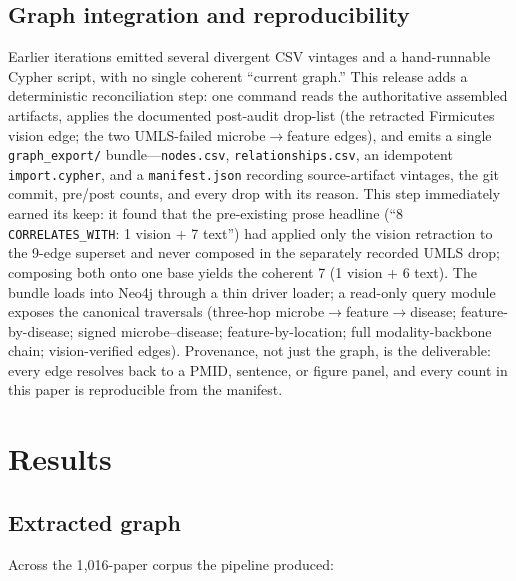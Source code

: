 \documentclass[10pt,twocolumn,letterpaper]{article}
\begin{document}
\subsection{Graph integration and reproducibility}
\label{sec:neo4j}

Earlier iterations emitted several divergent CSV vintages and a hand-runnable
Cypher script, with no single coherent ``current graph.'' This release adds a
deterministic reconciliation step: one command reads the authoritative
assembled artifacts, applies the documented post-audit drop-list (the
retracted Firmicutes vision edge; the two UMLS-failed
microbe$\rightarrow$feature edges), and emits a single
\texttt{graph\_export/} bundle---\texttt{nodes.csv},
\texttt{relationships.csv}, an idempotent \texttt{import.cypher}, and a
\texttt{manifest.json} recording source-artifact vintages, the git commit,
pre/post counts, and every drop with its reason. This step immediately earned
its keep: it found that the pre-existing prose headline (``8
\texttt{CORRELATES\_WITH}: 1 vision + 7 text'') had applied only the vision
retraction to the 9-edge superset and never composed in the separately
recorded UMLS drop; composing both onto one base yields the coherent 7 (1
vision + 6 text). The bundle loads into Neo4j through a thin driver loader; a
read-only query module exposes the canonical traversals (three-hop microbe$\rightarrow$feature$\rightarrow$disease;
feature-by-disease; signed microbe--disease; feature-by-location; full
modality-backbone chain; vision-verified edges). Provenance, not just the
graph, is the deliverable: every edge resolves back to a PMID, sentence, or
figure panel, and every count in this paper is reproducible from the
manifest.

\section{Results}
\label{sec:results}

\subsection{Extracted graph}

Across the 1{,}016-paper corpus the pipeline produced:
\end{document}
